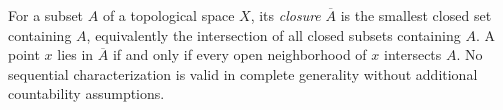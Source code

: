 
For a subset $A$ of a topological space $X$, its \emph{closure} $\overline A$ is the smallest closed set containing $A$, equivalently the intersection of all closed subsets containing $A$. A point $x$ lies in $\overline A$ if and only if every open neighborhood of $x$ intersects $A$. No sequential characterization is valid in complete generality without additional countability assumptions.
